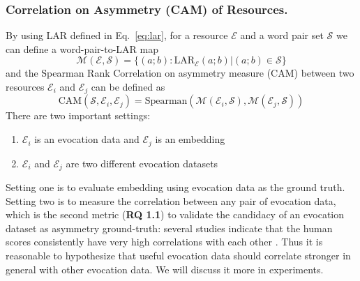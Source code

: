 \documentclass[letterpaper]{article} %
\begin{document}
\subsubsection{Correlation on Asymmetry (CAM) of Resources.}
By using LAR defined in Eq.~\ref{eq:lar}, for a resource $\mathcal{E}$ and a word pair set $\mathcal{S}$ we can define a word-pair-to-LAR map
\begin{equation}
\label{eq:m}
\mathcal{M}(\mathcal{E},\mathcal{S}) = \{(a;b):\text{LAR}_\mathcal{E}(a;b) | (a;b) \in \mathcal{S}\}
\end{equation}
and the Spearman Rank Correlation on asymmetry measure (CAM) between two resources $\mathcal{E}_i$ and $\mathcal{E}_j$ can be defined as
\begin{equation}
    \text{CAM}(\mathcal{S}, \mathcal{E}_i, \mathcal{E}_j)=\text{Spearman}(\mathcal{M}(\mathcal{E}_i,\mathcal{S}), \mathcal{M}(\mathcal{E}_j,\mathcal{S}))
    \label{eq:cam}
\end{equation}
There are two important settings:
\begin{enumerate}
    \item $\mathcal{E}_i$ is an evocation data and $\mathcal{E}_j$ is an embedding
    \item $\mathcal{E}_i$ and $\mathcal{E}_j$ are two different evocation datasets
\end{enumerate}
Setting one is to evaluate embedding using evocation data as the ground truth. Setting two is to measure the correlation between any pair of evocation data, which is the second metric (\textbf{RQ 1.1}) to validate the candidacy of an evocation dataset as asymmetry ground-truth: several studies indicate that the human scores consistently have very high correlations with each other \cite{miller1991contextual,Resnik:1995:UIC:1625855.1625914}. Thus it is reasonable to hypothesize that useful evocation data should correlate stronger in general with other evocation data. We will discuss it more in experiments.
\end{document}
